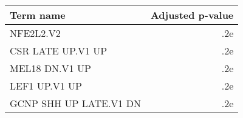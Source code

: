 \begin{tabular}{lr}
\toprule
             Term name &  Adjusted p-value \\
\midrule
             NFE2L2.V2 &               .2e \\
     CSR LATE UP.V1 UP &               .2e \\
        MEL18 DN.V1 UP &               .2e \\
         LEF1 UP.V1 UP &               .2e \\
GCNP SHH UP LATE.V1 DN &               .2e \\
\bottomrule
\end{tabular}
